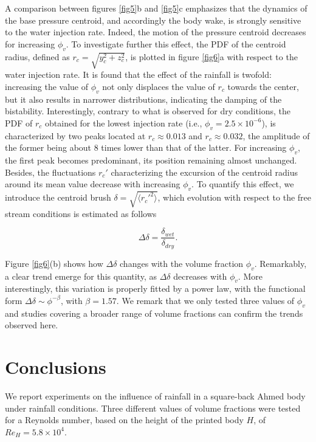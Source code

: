 \documentclass[doublecol]{epl2}
\begin{document}
A comparison between figures \ref{fig5}b and \ref{fig5}c emphasizes that the dynamics of the base pressure centroid, and accordingly the body wake, is strongly sensitive to the water injection rate. Indeed, the motion of the pressure centroid decreases for increasing $\phi_v$. To investigate further this effect, the PDF of the centroid radius, defined as $r_c = \sqrt{y_c^2 + z_c^2}$, is plotted in figure \ref{fig6}a with respect to the water injection rate. It is found that the effect of the rainfall is twofold: increasing the value of $\phi_v$ not only displaces the value of $r_c$ towards the center, but it also results in narrower distributions, indicating the damping of the bistability. Interestingly, contrary to what is observed for dry conditions, the PDF of $r_c$ obtained for the lowest injection rate (i.e., $\phi_v = 2.5\times10^{-6}$), is characterized by two peaks located at $r_c \approx 0.013$ and $r_c \approx 0.032$, the amplitude of the former being about 8 times lower than that of the latter. For increasing $\phi_v$, the first peak becomes predominant, its position remaining almost unchanged. Besides, the fluctuations $r_c'$ characterizing the excursion of the centroid radius around its mean value decrease with increasing $\phi_v$. To quantify this effect, we introduce the centroid brush $\delta = \sqrt{\langle r_c'^2 \rangle}$, which evolution with respect to the free stream conditions is estimated as follows
 
 \begin{equation}\label{eqr}
 \Delta \delta = \frac{\delta_{wet}}{ \delta_{dry}}.
 \end{equation}
 
\noindent Figure \ref{fig6}(b) shows how $\Delta \delta$ changes with the volume fraction $\phi_v$. Remarkably, a clear trend emerge for this quantity, as $\Delta \delta$ decreases with $\phi_v$. More interestingly, this variation is properly fitted by a power law, with the functional form $\Delta \delta \sim \phi^{-\beta}$, with $\beta=1.57$. We remark that we only tested three values of $\phi_v$ and studies covering a broader range of volume fractions can confirm the trends observed here. 


\section{Conclusions}

We report experiments on the influence of rainfall in a square-back Ahmed body under rainfall conditions. Three different values of volume fractions were tested for a Reynolds number, based on the height of the printed body $H$, of $Re_H=5.8 \times 10^4$.
\end{document}
